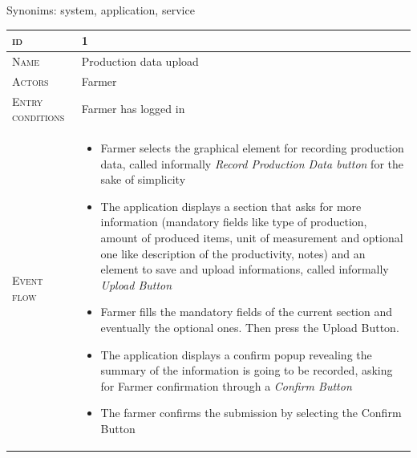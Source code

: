 Synonims: system, application, service



\begin{table}[H]
    \centering
    \begin{tabular}[c]{|l|p{}|}
        \hline %
    	\textsc{id}                 &   1\\
    	\hline %
    	\textsc{Name}               &   Production data upload\\
    	\hline %
    	\textsc{Actors}             &   Farmer\\
    	\hline %
    	\textsc{Entry conditions}   &   Farmer has logged in\\
    	\hline %
    	\textsc{Event flow}         &   %
            	                        \begin{itemize}
                                    	    \item Farmer selects the graphical element for recording production data, called informally \textit{Record Production Data button} for the sake of simplicity
                                    		\item The application displays a section that asks for more information (mandatory fields like type of production, amount of produced items, unit of measurement and optional one like description of the productivity, notes) and an element to save and upload informations, called informally \textit{Upload Button}
                                    		\item Farmer fills the mandatory fields of the current section and eventually the optional ones. Then press the Upload Button.
                                    		\item The application displays a confirm popup revealing the summary of the information is going to be recorded, asking for Farmer confirmation through a \textit{Confirm Button}
                                    		\item The farmer confirms the submission by selecting the Confirm Button
                                        \end{itemize}\\

\end{tabular}
\end{table}
